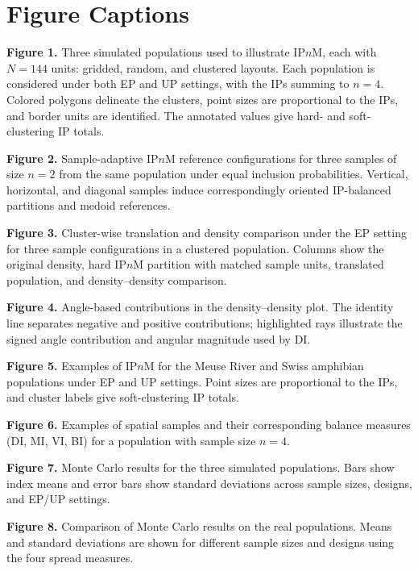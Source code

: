 \documentclass[12pt]{imsart}
\theoremstyle{plain}
\theoremstyle{remark}
\begin{document}
\section*{Figure Captions}
\noindent\textbf{Figure 1.} Three simulated populations used to illustrate IP\(n\)M, each with \(N=144\) units: gridded, random, and clustered layouts. Each population is considered under both EP and UP settings, with the IPs summing to \(n=4\). Colored polygons delineate the clusters, point sizes are proportional to the IPs, and border units are identified. The annotated values give hard- and soft-clustering IP totals.\par\medskip
\noindent\textbf{Figure 2.} Sample-adaptive IP\(n\)M reference configurations for three samples of size \(n=2\) from the same population under equal inclusion probabilities. Vertical, horizontal, and diagonal samples induce correspondingly oriented IP-balanced partitions and medoid references.\par\medskip
\noindent\textbf{Figure 3.} Cluster-wise translation and density comparison under the EP setting for three sample configurations in a clustered population. Columns show the original density, hard IP\(n\)M partition with matched sample units, translated population, and density--density comparison.\par\medskip
\noindent\textbf{Figure 4.} Angle-based contributions in the density--density plot. The identity line separates negative and positive contributions; highlighted rays illustrate the signed angle contribution and angular magnitude used by DI.\par\medskip
\noindent\textbf{Figure 5.} Examples of IP\(n\)M for the Meuse River and Swiss amphibian populations under EP and UP settings. Point sizes are proportional to the IPs, and cluster labels give soft-clustering IP totals.\par\medskip
\noindent\textbf{Figure 6.} Examples of spatial samples and their corresponding balance measures (DI, MI, VI, BI) for a population with sample size \(n=4\).\par\medskip
\noindent\textbf{Figure 7.} Monte Carlo results for the three simulated populations. Bars show index means and error bars show standard deviations across sample sizes, designs, and EP/UP settings.\par\medskip
\noindent\textbf{Figure 8.} Comparison of Monte Carlo results on the real populations. Means and standard deviations are shown for different sample sizes and designs using the four spread measures.\par\medskip
\end{document}
